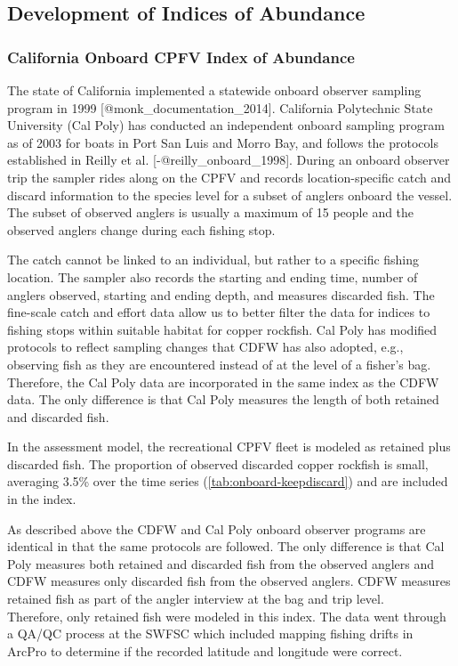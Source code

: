 \documentclass[11pt,
  letterpaper,
]{article}
\begin{document}
\pagebreak

\subsection{Development of Indices of Abundance}\label{development-of-indices-of-abundance}

\subsubsection{California Onboard CPFV Index of Abundance}\label{onboard-cpfv-index}

The state of California implemented a statewide onboard observer sampling program in 1999 {[}@monk\_documentation\_2014{]}. California Polytechnic State University (Cal Poly) has conducted an independent onboard sampling program as of 2003 for boats in Port San Luis and Morro Bay, and follows the protocols established in Reilly et al. {[}-@reilly\_onboard\_1998{]}. During an onboard observer trip the sampler rides along on the CPFV and records location-specific catch and discard information to the species level for a subset of anglers onboard the vessel. The subset of observed anglers is usually a maximum of 15 people and the observed anglers change during each fishing stop.

The catch cannot be linked to an individual, but rather to a specific fishing location. The sampler also records the starting and ending time, number of anglers observed, starting and ending depth, and measures discarded fish. The fine-scale catch and effort data allow us to better filter the data for indices to fishing stops within suitable habitat for copper rockfish. Cal Poly has modified protocols to reflect sampling changes that CDFW has also adopted, e.g., observing fish as they are encountered instead of at the level of a fisher's bag. Therefore, the Cal Poly data are incorporated in the same index as the CDFW data. The only difference is that Cal Poly measures the length of both retained and discarded fish.

In the assessment model, the recreational CPFV fleet is modeled as retained plus discarded fish. The proportion of observed discarded copper rockfish is small, averaging 3.5\% over the time series (\ref{tab:onboard-keepdiscard}) and are included in the index.

As described above the CDFW and Cal Poly onboard observer programs are identical in that the same protocols are followed. The only difference is that Cal Poly measures both retained and discarded fish from the observed anglers and CDFW measures only discarded fish from the observed anglers. CDFW measures retained fish as part of the angler interview at the bag and trip level.\\
Therefore, only retained fish were modeled in this index. The data went through a QA/QC process at the SWFSC which included mapping fishing drifts in ArcPro to determine if the recorded latitude and longitude were correct.
\end{document}
